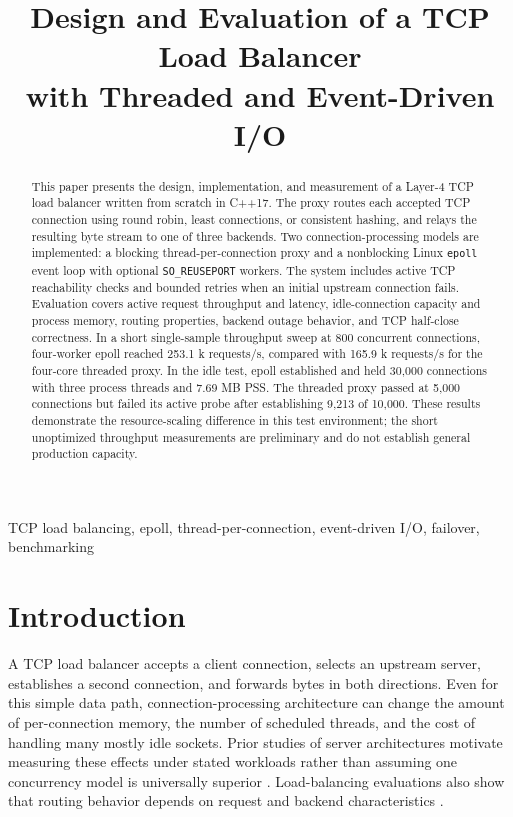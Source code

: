 \documentclass[conference]{IEEEtran}
\title{Design and Evaluation of a TCP Load Balancer\\with Threaded and Event-Driven I/O}
\author{
\IEEEauthorblockN{Sanskar Sharma, Prayag Kirar, and Piyush Satiya}
\IEEEauthorblockA{Department of Computer Science and Engineering\\
Indian Institute of Information Technology Vadodara\\
Gandhinagar, India\\
202451148, 202451134, 202451130}
\and
\IEEEauthorblockN{Prof. Rishabh Gupta}
\IEEEauthorblockA{Indian Institute of Information Technology Vadodara\\
Gandhinagar, India}
}
\begin{document}
\maketitle

\begin{abstract}
This paper presents the design, implementation, and measurement of a Layer-4 TCP load balancer written from scratch in C++17. The proxy routes each accepted TCP connection using round robin, least connections, or consistent hashing, and relays the resulting byte stream to one of three backends. Two connection-processing models are implemented: a blocking thread-per-connection proxy and a nonblocking Linux \texttt{epoll} event loop with optional \texttt{SO\_REUSEPORT} workers. The system includes active TCP reachability checks and bounded retries when an initial upstream connection fails. Evaluation covers active request throughput and latency, idle-connection capacity and process memory, routing properties, backend outage behavior, and TCP half-close correctness. In a short single-sample throughput sweep at 800 concurrent connections, four-worker epoll reached 253.1 k requests/s, compared with 165.9 k requests/s for the four-core threaded proxy. In the idle test, epoll established and held 30,000 connections with three process threads and 7.69 MB PSS. The threaded proxy passed at 5,000 connections but failed its active probe after establishing 9,213 of 10,000. These results demonstrate the resource-scaling difference in this test environment; the short unoptimized throughput measurements are preliminary and do not establish general production capacity.
\end{abstract}

\begin{IEEEkeywords}
TCP load balancing, epoll, thread-per-connection, event-driven I/O, failover, benchmarking
\end{IEEEkeywords}

\section{Introduction}
A TCP load balancer accepts a client connection, selects an upstream server, establishes a second connection, and forwards bytes in both directions. Even for this simple data path, connection-processing architecture can change the amount of per-connection memory, the number of scheduled threads, and the cost of handling many mostly idle sockets. Prior studies of server architectures motivate measuring these effects under stated workloads rather than assuming one concurrency model is universally superior \cite{pariag}. Load-balancing evaluations also show that routing behavior depends on request and backend characteristics \cite{rawls}.
\end{document}
